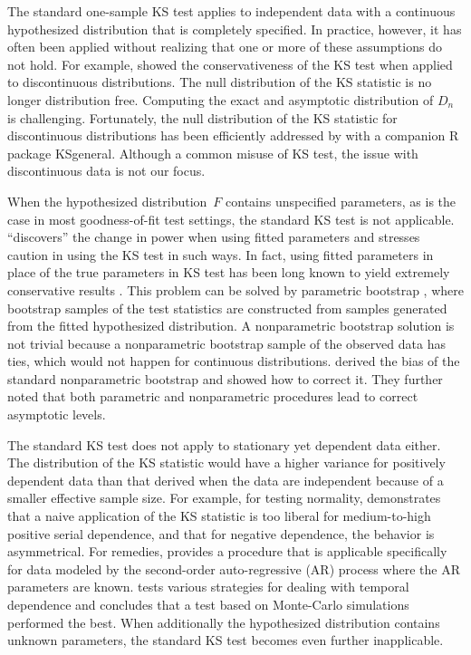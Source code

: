 \documentclass[12pt, letterpaper, titlepage]{article}
\begin{document}
The standard one-sample KS test applies to independent data with a continuous
hypothesized distribution that is completely specified. In practice, however, it
has often been applied without realizing that one or more of these assumptions
do not hold. For example, \citet{noether1963note} showed the conservativeness of
the KS test when applied to discontinuous distributions. The null distribution
of the KS statistic is no longer distribution free. Computing the
exact and asymptotic distribution of $D_n$ is challenging. Fortunately, the null
distribution of the KS statistic for discontinuous distributions has been
efficiently addressed by \citet{dimitrova2020computing} with a
companion R package \textsf{KSgeneral}. Although a common misuse of KS test, the
issue with discontinuous data is not our focus.


When the hypothesized distribution~$F$ contains unspecified parameters, as is
the case in most goodness-of-fit test settings, the standard KS test is not
applicable. \citet{steinskog2007cautionary} ``discovers'' the change in power
when using fitted parameters and stresses caution in using the KS test in
such ways. In fact, using fitted parameters in place of the true parameters in
KS test has been long known to yield extremely conservative results
\citep[e.g.,][]{lilliefors1967kolmogorov}. This problem can be solved by
parametric bootstrap \citep{efron1985bootstrap, hall1991two}, where
bootstrap samples of the test statistics are constructed from samples
generated from the fitted hypothesized distribution. A nonparametric bootstrap
solution is not trivial because a nonparametric bootstrap sample of the
observed data has ties, which would not happen for continuous distributions.
\citet{babu2004goodness} derived the bias of the standard nonparametric 
bootstrap and
showed how to correct it. They further noted that both parametric and
nonparametric procedures lead to correct asymptotic levels.


The standard KS test does not apply to stationary yet dependent data either. The
distribution of the KS statistic would have a higher variance for positively
dependent data than that derived when the data are independent because of a
smaller effective sample size. For example, for testing normality,
\citet{durilleul1992lack} demonstrates that a naive application of
the KS statistic is too liberal for medium-to-high positive serial dependence,
and that for negative dependence, the behavior is asymmetrical. For remedies,
\citet{weiss1978modification} provides a procedure that is applicable 
specifically for data
modeled by the second-order auto-regressive (AR) process where the AR parameters
are known. \citet{lanzante2021testing} tests various strategies for dealing with
temporal
dependence and concludes that a test based on Monte-Carlo simulations performed
the best. When additionally the hypothesized distribution contains unknown
parameters, the standard KS test becomes even further inapplicable.
\end{document}
